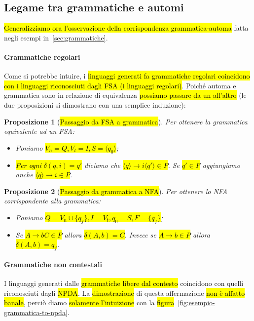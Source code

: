 \documentclass[a4paper,11pt,oneside]{article}
\theoremstyle{plain}
\newtheorem{prop}{Proposizione}[section]
\theoremstyle{definition}
\theoremstyle{remark}
\begin{document}
\subsection{Legame tra grammatiche e automi}\label{sec:gramamtiche-automi}

\hl{Generalizziamo ora l'osservazione della corrispondenza grammatica-automa}
fatta negli esempi in~\ref{sec:grammatiche}.

\paragraph{Grammatiche regolari} Come si potrebbe intuire, i \hl{linguaggi
generati fa grammatiche regolari coincidono con i linguaggi riconosciuti dagli
FSA (i linguaggi regolari)}. Poiché automa e grammatica sono in relazione di
equivalenza \hl{possiamo passare da un all'altro} (le due proposizioni si
dimostrano con una semplice induzione):

\begin{prop}[\hl{Passaggio da FSA a grammatica}]
  Per ottenere la grammatica equivalente ad un FSA\@:

  \begin{itemize}
    \item Poniamo \hl{$V_n = Q, V_t = I, S = \langle q_0 \rangle$};
    \item \hl{Per ogni $\delta(q, i) = q'$} diciamo che
      \hl{$\langle q \rangle \to i \langle q' \rangle \in P$}. Se
      \hl{$q' \in F$} aggiungiamo anche \hl{$\langle q \rangle \to i \in P$}.
  \end{itemize}
\end{prop}

\begin{prop}[\hl{Passaggio da grammatica a NFA}]
  Per ottenere lo NFA corrispondente alla grammatica:

  \begin{itemize}
    \item Poniamo \hl{$Q = V_n \cup \{q_f\}, I = V_t, q_0 = S, F = \{q_f\}$};
    \item Se \hl{$A \to bC \in P$} allora \hl{$\delta(A,b) = C$}. Invece se
      \hl{$A \to b \in P$} allora \hl{$\delta(A, b) = q_f$}.
  \end{itemize}
\end{prop}

\paragraph{Grammatiche non contestali} I linguaggi generati dalle
\hl{grammatiche libere dal contesto} coincidono con quelli riconosciuti dagli
\hl{NPDA}\@. La \hl{dimostrazione} di questa affermazione \hl{non è affatto
banale}, perciò diamo \hl{solamente l'intuizione} con la
\hl{figura}~\ref{fig:esempio-grammatica-to-npda}.
\end{document}

